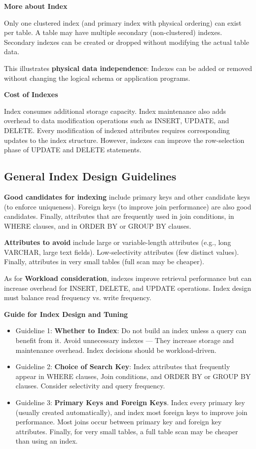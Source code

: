 \documentclass[11pt]{article}
\newcommand{\vs}[]{
    \vspace{11pt}
}
\newcommand{\subsec}[1]{
    \vspace{11pt}
    \subsection{#1}
    \vspace{11pt}
}
\newcommand{\boldsec}[1]{
    \vspace{11pt}
    \textbf{#1}
    \vspace{11pt}
}
\begin{document}
\boldsec{More about Index}

Only one clustered index (and primary index with physical ordering) can exist per table. A table may have multiple secondary (non-clustered) indexes. Secondary indexes can be created or dropped without modifying the actual table data.

This illustrates \textbf{physical data independence}: Indexes can be added or removed without changing the logical schema or application programs.

\boldsec{Cost of Indexes}

Index consumes additional storage capacity. Index maintenance also adds overhead to data modification operations such as INSERT, UPDATE, and DELETE. Every modification of indexed attributes requires corresponding updates to the index structure. However, indexes can improve the row-selection phase of UPDATE and DELETE statements.

\subsec{General Index Design Guidelines}

\textbf{Good candidates for indexing} include primary keys and other candidate keys (to enforce uniqueness). Foreign keys (to improve join performance) are also good candidates. Finally, attributes that are frequently used in join conditions, in WHERE clauses, and in ORDER BY or GROUP BY clauses.

\textbf{Attributes to avoid} include large or variable-length attributes (e.g., long VARCHAR, large text fields). Low-selectivity attributes (few distinct values). Finally, attributes in very small tables (full scan may be cheaper).

As for \textbf{Workload consideration}, indexes improve retrieval performance but can increase overhead for INSERT, DELETE, and UPDATE operations. Index design must balance read frequency vs. write frequency.

\boldsec{Guide for Index Design and Tuning}

\begin{itemize}
    \item Guideline 1: \textbf{Whether to Index}: Do not build an index unless a query can benefit from it. Avoid unnecessary indexes --- They increase storage and maintenance overhead. Index decisions should be workload-driven.
    \item Guideline 2: \textbf{Choice of Search Key}: Index attributes that frequently appear in WHERE clauses, Join conditions, and ORDER BY or GROUP BY clauses. Consider selectivity and query frequency.
    \item Guideline 3: \textbf{Primary Keys and Foreign Keys}. Index every primary key (usually created automatically), and index most foreign keys to improve join performance. Most joins occur between primary key and foreign key attributes. Finally, for very small tables, a full table scan may be cheaper than using an index.
\end{itemize}
\vs
\end{document}

